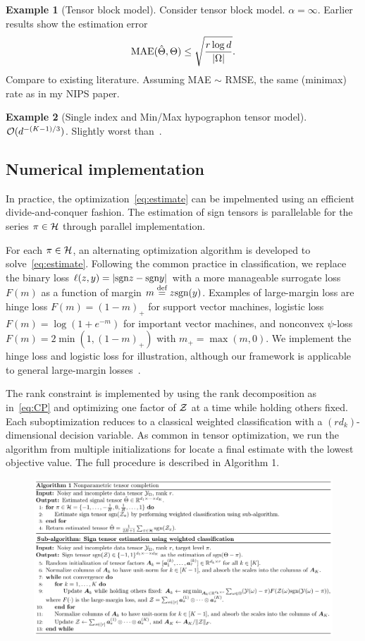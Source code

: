 \documentclass{article}
\theoremstyle{plain}
\theoremstyle{definition}
\newtheorem{example}{Example}
\def\sign{\textup{sgn}}
\begin{document}
\begin{example}[Tensor block model]
Consider tensor block model. $\alpha=\infty$. Earlier results show the estimation error
\[
\textup{MAE}(\hat \Theta, \Theta)\leq \sqrt{r\log d \over |\Omega|}.
\]
Compare to existing literature. Assuming MAE $\sim$ RMSE, the same (minimax) rate as in my NIPS paper. 
 
\end{example}
\begin{example}[Single index and Min/Max hypographon tensor model]
$\mathcal{O}(d^{-(K-1)/3})$. Slightly worst than~\citet{ganti2015matrix}.
\end{example}

\subsection{Numerical implementation}
In practice, the optimization~\eqref{eq:estimate} can be impelmented using an efficient divide-and-conquer fashion. The estimation of sign tensors is parallelable for the series $\pi \in \mathcal{H}$ through parallel implementation. 

For each $\pi\in\mathcal{H}$, an alternating optimization algorithm is developed to solve~\eqref{eq:estimate}. Following the common practice in classification, we replace the binary loss $\ell(z,y)=|\sign z - \sign y|$ with a more manageable surrogate loss $F(m)$ as a function of margin $m\stackrel{\text{def}}{=}z\sign(y)$. Examples of large-margin loss are hinge loss $F(m) = (1-m)_+$ for support vector machines, logistic loss $F(m) =\log(1+e^{-m})$ for important vector machines, and nonconvex $\psi$-loss $F(m)=2\min(1,(1-m)_+)$ with $m_{+}=\max(m,0)$. We implement the hinge loss and logistic loss for illustration, although our framework is applicable to general large-margin losses~\citep{bartlett2006convexity}. 

The rank constraint is implemented by using the rank decomposition as in~\eqref{eq:CP} and optimizing one factor of $\mathcal{Z}$ at a time while holding others fixed. Each suboptimization reduces to a classical weighted classification with a $(rd_k)$-dimensional decision variable. As common in tensor optimization, we run the algorithm from multiple initializations for locate a final estimate with the lowest objective value. The full procedure is described in Algorithm 1.

\begin{figure}[h]
\includegraphics[width=\textwidth]{algorithm.pdf}
\end{figure}
\end{document}
